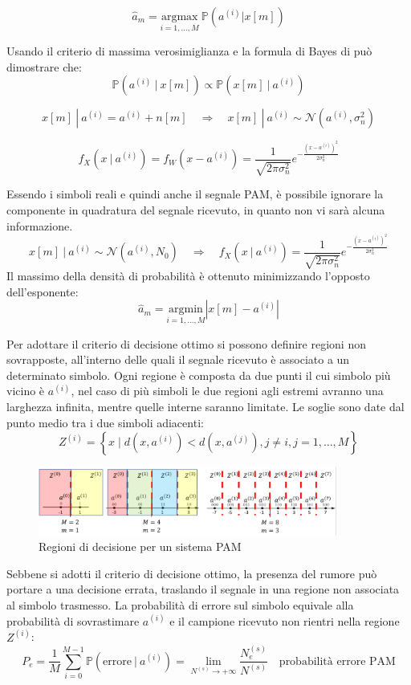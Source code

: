 \[
    \hat{a}_m = \underset{i=1,\ldots,M}{\mathrm{argmax}} \ \mathbb{P}(a^{(i)}|x[m])
\]

Usando il criterio di massima verosimiglianza e la formula di Bayes di può dimostrare che:
\[
    \mathbb{P}(a^{(i)} \ | \ x[m]) \propto  \mathbb{P}(x[m] \ | \ a^{(i)})
\]

\[
    x[m] \ | \ a^{(i)}  = a^{(i)} + n[m] \quad \Rightarrow \quad x[m] \ | \ a^{(i)} \sim \mathcal{N}(a^{(i)}, \sigma_n^2)
\]

\[
    f_X(x \ | \ a^{(i)}) = f_{W}(x - a^{(i)}) = \frac{1}{\sqrt{2\pi \sigma_n^2}} e^{-\frac{(x - a^{(i)})^2}{2\sigma_n^2}}
\]


Essendo i simboli reali e quindi anche il segnale PAM, è possibile ignorare la componente in quadratura del segnale ricevuto, in quanto non vi sarà alcuna informazione.
\[
    x[m] \ | \ a^{(i)} \sim \mathcal{N}(a^{(i)}, N_0) \quad \Rightarrow \quad f_X(x \ | \ a^{(i)}) = \frac{1}{\sqrt{2\pi \sigma_n^2}} e^{-\frac{(x - a^{(i)})^2}{2\sigma_n^2}}
\]
Il massimo della densità di probabilità è ottenuto minimizzando l'opposto dell'esponente:
\[
    \hat{a}_m = \underset{i=1,\ldots,M}{\mathrm{argmin}} \left| x[m] - a^{(i)} \right| 
\]

Per adottare il criterio di decisione ottimo si possono definire regioni non sovrapposte, all'interno delle quali il segnale ricevuto è associato a un determinato simbolo.
Ogni regione è composta da due punti il cui simbolo più vicino è $a^{(i)}$, nel caso di più simboli le due regioni agli estremi avranno una larghezza infinita, mentre quelle interne saranno limitate.
Le soglie sono date dal punto medio tra i due simboli adiacenti:
\[
    Z^{(i)} = \left\{ x \mid d(x, a^{(i)}) < d(x, a^{(j)}), j \neq i, j = 1, \ldots, M \right\}
\]


\begin{figure}[ht]
    \centering
    \includegraphics[width=0.875\textwidth]{imgs/regions.png}
    \caption*{Regioni di decisione per un sistema PAM}
\end{figure}





Sebbene si adotti il criterio di decisione ottimo, la presenza del rumore può portare a una decisione errata, traslando il segnale in una regione non associata al simbolo trasmesso.
La probabilità di errore sul simbolo equivale alla probabilità di sovrastimare $a^{(i)}$ e il campione ricevuto non rientri nella regione $Z^{(i)}$:
\[
    P_e = \frac{1}{M} \sum_{i=0}^{M-1} \mathbb{P}(\text{errore} \ | \ a^{(i)}) = \lim_{N^{(s)} \to +\infty} \frac{N_e^{(s)}}{N^{(s)}} \quad \text{probabilità errore PAM}
\]

